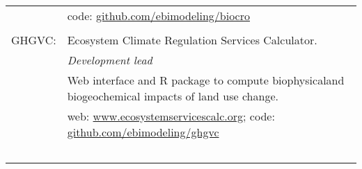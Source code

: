 \documentclass[a4paper,10pt]{article}
\begin{document}
\begin{tabular}{rp{11cm}}
&\small code: \href{https://github.com/ebimodeling/biocro}{github.com/ebimodeling/biocro}\\
\multicolumn{2}{c}{} \\
GHGVC:& Ecosystem Climate Regulation Services Calculator.\\
& \small \textit{Development lead}\\
& \footnotesize Web interface and R package to compute biophysicaland biogeochemical impacts of land use change.\\
& \small web: \href{https://www.ecosystemservicescalc.org}{www.ecosystemservicescalc.org}; code: \href{https://github.com/ebimodeling/ghgvc}{github.com/ebimodeling/ghgvc}%
\\\

\end{tabular}






\end{document}
